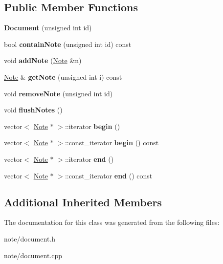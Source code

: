 \subsection*{Public Member Functions}
\begin{DoxyCompactItemize}
\item 
\hypertarget{class_document_a10d11e3a041e58a5b95d86e9edf2d01e}{{\bfseries Document} (unsigned int id)}\label{class_document_a10d11e3a041e58a5b95d86e9edf2d01e}

\item 
\hypertarget{class_document_af33a2f6379ef340021a61ccb7fce0311}{bool {\bfseries contain\-Note} (unsigned int id) const }\label{class_document_af33a2f6379ef340021a61ccb7fce0311}

\item 
\hypertarget{class_document_a4082689af07da4847c289752104cac91}{void {\bfseries add\-Note} (\hyperlink{class_note}{Note} \&n)}\label{class_document_a4082689af07da4847c289752104cac91}

\item 
\hypertarget{class_document_a1645bf5287fd9e4633124ed68aa045a8}{\hyperlink{class_note}{Note} \& {\bfseries get\-Note} (unsigned int i) const }\label{class_document_a1645bf5287fd9e4633124ed68aa045a8}

\item 
\hypertarget{class_document_ad1b3f1d090008d552e195af7fef94b51}{void {\bfseries remove\-Note} (unsigned int id)}\label{class_document_ad1b3f1d090008d552e195af7fef94b51}

\item 
\hypertarget{class_document_af96c6dc5087a4f5d97524784638fd44f}{void {\bfseries flush\-Notes} ()}\label{class_document_af96c6dc5087a4f5d97524784638fd44f}

\item 
\hypertarget{class_document_a69562d2facffa04076d05406ef9ee49c}{vector$<$ \hyperlink{class_note}{Note} $\ast$ $>$\-::iterator {\bfseries begin} ()}\label{class_document_a69562d2facffa04076d05406ef9ee49c}

\item 
\hypertarget{class_document_acfe1c6d1c4b4a01738ce69dc901679a6}{vector$<$ \hyperlink{class_note}{Note} $\ast$ $>$\-::const\-\_\-iterator {\bfseries begin} () const }\label{class_document_acfe1c6d1c4b4a01738ce69dc901679a6}

\item 
\hypertarget{class_document_a4c599a3eecfc866a3209ed865c6cd6ce}{vector$<$ \hyperlink{class_note}{Note} $\ast$ $>$\-::iterator {\bfseries end} ()}\label{class_document_a4c599a3eecfc866a3209ed865c6cd6ce}

\item 
\hypertarget{class_document_af91a973cee7d16fa4c5037e7ac9bc9be}{vector$<$ \hyperlink{class_note}{Note} $\ast$ $>$\-::const\-\_\-iterator {\bfseries end} () const }\label{class_document_af91a973cee7d16fa4c5037e7ac9bc9be}

\end{DoxyCompactItemize}
\subsection*{Additional Inherited Members}


The documentation for this class was generated from the following files\-:\begin{DoxyCompactItemize}
\item 
note/document.\-h\item 
note/document.\-cpp\end{DoxyCompactItemize}
